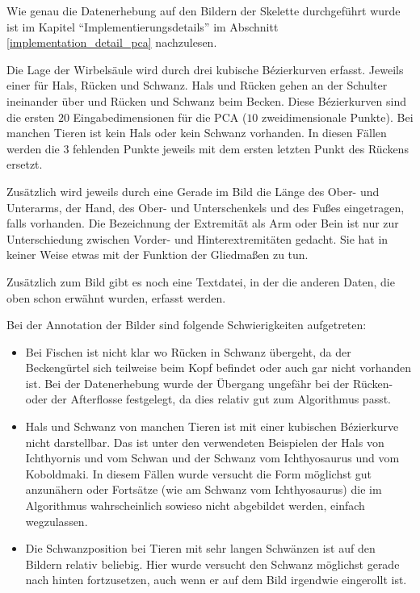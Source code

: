 Wie genau die Datenerhebung auf den Bildern der Skelette durchgeführt wurde ist im Kapitel "`Implementierungsdetails"' im Abschnitt \ref{implementation_detail_pca} nachzulesen.
 
 Die Lage der Wirbelsäule wird durch drei kubische Bézierkurven erfasst. Jeweils einer für Hals, Rücken und Schwanz. Hals und Rücken gehen an der Schulter ineinander über und Rücken und Schwanz beim Becken.
 Diese Bézierkurven sind die ersten $20$ Eingabedimensionen für die PCA ($10$ zweidimensionale Punkte). Bei manchen Tieren ist kein Hals oder kein Schwanz vorhanden. In diesen Fällen werden die $3$ fehlenden Punkte jeweils mit dem ersten \bzw letzten Punkt des Rückens ersetzt.
 
 Zusätzlich wird jeweils durch eine Gerade im Bild die Länge des Ober- und Unterarms, der Hand, des Ober- und Unterschenkels und des Fußes eingetragen, falls vorhanden. Die Bezeichnung der Extremität als Arm oder Bein ist nur zur Unterschiedung zwischen Vorder- und Hinterextremitäten gedacht. Sie hat in keiner Weise etwas mit der Funktion der Gliedmaßen zu tun.
 
 Zusätzlich zum Bild gibt es noch eine Textdatei, in der die anderen Daten, die oben schon erwähnt wurden, erfasst werden.
 
 Bei der Annotation der Bilder sind folgende Schwierigkeiten aufgetreten:
 
 \begin{itemize}
  \item Bei Fischen ist nicht klar wo Rücken in Schwanz übergeht, da der Beckengürtel sich teilweise beim Kopf befindet oder auch gar nicht vorhanden ist. Bei der Datenerhebung wurde der Übergang ungefähr bei der Rücken- oder der Afterflosse festgelegt, da dies relativ gut zum Algorithmus passt.
  
  \item Hals und Schwanz von manchen Tieren ist mit einer kubischen Bézierkurve nicht darstellbar. Das ist unter den verwendeten Beispielen der Hals von Ichthyornis und vom Schwan und der Schwanz vom Ichthyosaurus und vom Koboldmaki. In diesem Fällen wurde versucht die Form möglichst gut anzunähern oder Fortsätze (wie am Schwanz vom Ichthyosaurus) die im Algorithmus wahrscheinlich sowieso nicht abgebildet werden, einfach wegzulassen.
  
  \item Die Schwanzposition bei Tieren mit sehr langen Schwänzen ist auf den Bildern relativ beliebig. Hier wurde versucht den Schwanz möglichst gerade nach hinten fortzusetzen, auch wenn er auf dem Bild irgendwie eingerollt ist.
 \end{itemize}
 
